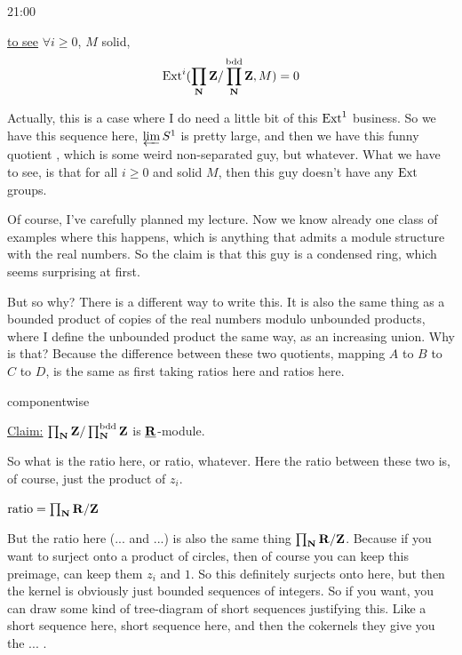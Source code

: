 \begin{unfinished}{21:00}
\begin{sketch}
\begin{sketch}
\underline{to see} $\forall i \geq 0$, $M$ solid,
\begin{align*}
	\operatorname{Ext}^i(\prod_\mathbf N \mathbf Z / \prod_\mathbf N^{\mathrm{bdd}} \mathbf Z, M) = 0
\end{align*}
\end{sketch}

Actually, this is a case where I do need a little bit of this $\operatorname{Ext}^1$ business.
So we have this sequence here, $\varprojlim S^1$ is pretty large, and then we have this funny quotient , which is some weird non-separated guy, but whatever. What we have to see, is that for all $i \geq 0$ and solid $M$, then this guy doesn't have any $\operatorname{Ext}$ groups.

Of course, I've carefully planned my lecture. 
Now we know already one class of examples where this happens, which is anything that admits a module structure with the real numbers. 
So the claim is that this guy is a condensed ring, which seems surprising at first.

But so why? There is a different way to write this. It is also the same thing as a bounded product of copies of the real numbers modulo unbounded products, where I define the unbounded product the same way, as an increasing union. Why is that? 
Because the difference between these two quotients, mapping $A$ to $B$ to $C$ to $D$, is the same as first taking ratios here and ratios here.

componentwise



\underline{Claim:} $\prod_\mathbf N \mathbf Z / \prod_\mathbf N^{\mathrm{bdd}} \mathbf Z$ is $\underline{\mathbf R}$-module.

\begin{sketch}
\end{sketch}


So what is the ratio here, or ratio, whatever. 
Here the ratio between these two is, of course, just the product of $z_i$. 

$ \text{ratio} = \prod_\mathbf N \mathbf R / \mathbf Z $ 

But the ratio here (... and ...) is also the same thing $\prod_\mathbf N \mathbf R / \mathbf Z$. 
Because if you want to surject onto a product of circles, then of course you can keep this preimage, can keep them $z_i$ and $1$.  
So this definitely surjects onto here, but then the kernel is obviously just bounded sequences of integers. 
So if you want, you can draw some kind of tree-diagram of short sequences justifying this. 
Like a short sequence here, short sequence here, and then the cokernels they give you the ... .


\end{sketch}
\end{unfinished}
